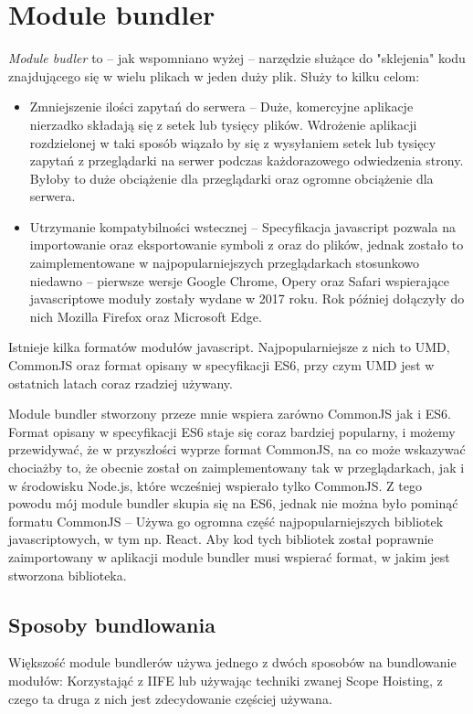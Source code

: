 \documentclass{SGGW-thesis}
\begin{document}
\chapter{Module bundler}
\emph{Module budler} to -- jak wspomniano wyżej -- narzędzie służące do "sklejenia" kodu znajdującego się w wielu plikach w jeden duży plik. Służy to kilku celom:
\begin{itemize}
    \item Zmniejszenie ilości zapytań do serwera -- Duże, komercyjne aplikacje nierzadko składają się z setek lub tysięcy plików. Wdrożenie aplikacji rozdzielonej w taki sposób wiązało by się z wysyłaniem setek lub tysięcy zapytań z przeglądarki na serwer podczas każdorazowego odwiedzenia strony. Byłoby to duże obciążenie dla przeglądarki oraz ogromne obciążenie dla serwera.
    \item Utrzymanie kompatybilności wstecznej -- Specyfikacja javascript pozwala na importowanie oraz eksportowanie symboli z oraz do plików, jednak zostało to zaimplementowane w najpopularniejszych przeglądarkach stosunkowo niedawno -- pierwsze wersje Google Chrome, Opery oraz Safari wspierające javascriptowe moduły zostały wydane w 2017 roku. Rok później dołączyły do nich Mozilla Firefox oraz Microsoft Edge.\cite{es6_modules_support}
\end{itemize}

Istnieje kilka formatów modułów javascript. Najpopularniejsze z nich to UMD, CommonJS oraz format opisany w specyfikacji ES6, przy czym UMD jest w ostatnich latach coraz rzadziej używany.\cite{es6_for_humans}

Module bundler stworzony przeze mnie wspiera zarówno CommonJS jak i ES6. Format opisany w specyfikacji ES6 staje się coraz bardziej popularny, i możemy przewidywać, że w przyszłości wyprze format CommonJS, na co może wskazywać chociażby to, że obecnie został on zaimplementowany tak w przeglądarkach, jak i w środowisku Node.js, które wcześniej wspierało tylko CommonJS\cite{nodejs_modules}. Z tego powodu mój module bundler skupia się na ES6, jednak nie można było pominąć formatu CommonJS -- Używa go ogromna część najpopularniejszych bibliotek javascriptowych, w tym np. React. Aby kod tych bibliotek został poprawnie zaimportowany w aplikacji module bundler musi wspierać format, w jakim jest stworzona biblioteka.


\section{Sposoby bundlowania}
Większość module bundlerów używa jednego z dwóch sposobów na bundlowanie modułów: Korzystająć z IIFE lub używając techniki zwanej Scope Hoisting, z czego ta druga z nich jest zdecydowanie częściej używana\cite{parcel_scope_hoisting}.
\end{document}
